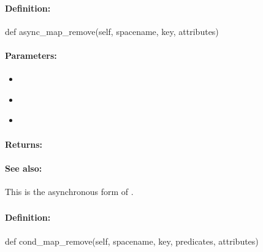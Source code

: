 \paragraph{Definition:}
\begin{pythoncode}
def async_map_remove(self, spacename, key, attributes)
\end{pythoncode}

\paragraph{Parameters:}
\begin{itemize}[noitemsep]
\item {}\\

\item {}\\

\item {}\\

\end{itemize}

\paragraph{Returns:}


\paragraph{See also:}  This is the asynchronous form of .

\pagebreak
\subsubsection{}
\label{api:python:cond_map_remove}


\paragraph{Definition:}
\begin{pythoncode}
def cond_map_remove(self, spacename, key, predicates, attributes)
\end{pythoncode}

